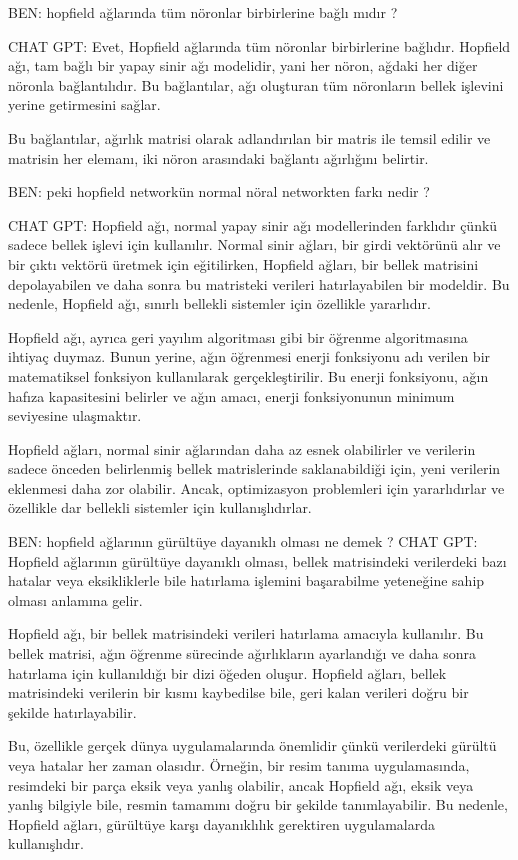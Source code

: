 \documentclass[11pt]{article}
\begin{document}
BEN: hopfield ağlarında tüm nöronlar birbirlerine bağlı mıdır ?

CHAT GPT: Evet, Hopfield ağlarında tüm nöronlar birbirlerine bağlıdır. Hopfield ağı, tam bağlı bir yapay sinir ağı modelidir, yani her nöron, ağdaki her diğer nöronla bağlantılıdır. Bu bağlantılar, ağı oluşturan tüm nöronların bellek işlevini yerine getirmesini sağlar. 

Bu bağlantılar, ağırlık matrisi olarak adlandırılan bir matris ile temsil edilir ve matrisin her elemanı, iki nöron arasındaki bağlantı ağırlığını belirtir.

BEN: peki hopfield networkün normal nöral networkten farkı nedir ?

CHAT GPT: Hopfield ağı, normal yapay sinir ağı modellerinden farklıdır çünkü sadece bellek işlevi için kullanılır. Normal sinir ağları, bir girdi vektörünü alır ve bir çıktı vektörü üretmek için eğitilirken, Hopfield ağları, bir bellek matrisini depolayabilen ve daha sonra bu matristeki verileri hatırlayabilen bir modeldir. Bu nedenle, Hopfield ağı, sınırlı bellekli sistemler için özellikle yararlıdır.

Hopfield ağı, ayrıca geri yayılım algoritması gibi bir öğrenme algoritmasına ihtiyaç duymaz. Bunun yerine, ağın öğrenmesi enerji fonksiyonu adı verilen bir matematiksel fonksiyon kullanılarak gerçekleştirilir. Bu enerji fonksiyonu, ağın hafıza kapasitesini belirler ve ağın amacı, enerji fonksiyonunun minimum seviyesine ulaşmaktır.

Hopfield ağları, normal sinir ağlarından daha az esnek olabilirler ve verilerin sadece önceden belirlenmiş bellek matrislerinde saklanabildiği için, yeni verilerin eklenmesi daha zor olabilir. Ancak, optimizasyon problemleri için yararlıdırlar ve özellikle dar bellekli sistemler için kullanışlıdırlar.

BEN: hopfield ağlarının gürültüye dayanıklı olması ne demek ?
CHAT GPT: Hopfield ağlarının gürültüye dayanıklı olması, bellek matrisindeki verilerdeki bazı hatalar veya eksikliklerle bile hatırlama işlemini başarabilme yeteneğine sahip olması anlamına gelir.

Hopfield ağı, bir bellek matrisindeki verileri hatırlama amacıyla kullanılır. Bu bellek matrisi, ağın öğrenme sürecinde ağırlıkların ayarlandığı ve daha sonra hatırlama için kullanıldığı bir dizi öğeden oluşur. Hopfield ağları, bellek matrisindeki verilerin bir kısmı kaybedilse bile, geri kalan verileri doğru bir şekilde hatırlayabilir.

Bu, özellikle gerçek dünya uygulamalarında önemlidir çünkü verilerdeki gürültü veya hatalar her zaman olasıdır. Örneğin, bir resim tanıma uygulamasında, resimdeki bir parça eksik veya yanlış olabilir, ancak Hopfield ağı, eksik veya yanlış bilgiyle bile, resmin tamamını doğru bir şekilde tanımlayabilir. Bu nedenle, Hopfield ağları, gürültüye karşı dayanıklılık gerektiren uygulamalarda kullanışlıdır.
\end{document}
